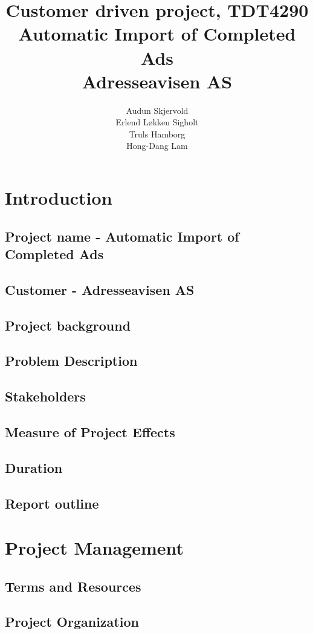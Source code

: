 \documentclass[12pt, a4paper]{article}
\title{\normalsize Customer driven project, TDT4290 \\ \LARGE \textbf{Automatic Import of Completed Ads} \normalsize \\Adresseavisen AS}
\author{Audun Skjervold \\ Erlend Løkken Sigholt \\ Truls Hamborg \\ Hong-Dang Lam}
\begin{document}
\maketitle 
\newpage
\tableofcontents
\newpage


 
\section{Introduction}
\subsection{Project name - Automatic Import of Completed Ads}
\subsection{Customer - Adresseavisen AS}
\subsection{Project background}
\subsection{Problem Description}
\subsection{Stakeholders}
\subsection{Measure of Project Effects}
\subsection{Duration}

\subsection{Report outline}

\section{Project Management}
\subsection{Terms and Resources}
\subsection{Project Organization}
\end{document}

